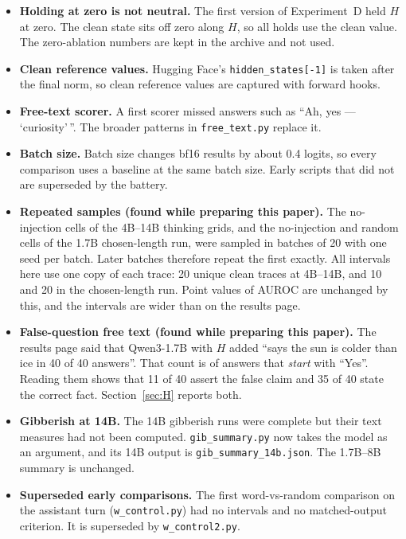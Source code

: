 \documentclass[11pt]{article}
\begin{document}
\begin{itemize}
  \item \textbf{Holding at zero is not neutral.} The first version of Experiment~D held $H$ at zero. The clean state sits off zero along $H$, so all holds use the clean value. The zero-ablation numbers are kept in the archive and not used.
  \item \textbf{Clean reference values.} Hugging Face's \texttt{hidden\_states[-1]} is taken after the final norm, so clean reference values are captured with forward hooks.
  \item \textbf{Free-text scorer.} A first scorer missed answers such as ``Ah, yes --- `curiosity'\,''. The broader patterns in \texttt{free\_text.py} replace it.
  \item \textbf{Batch size.} Batch size changes bf16 results by about 0.4 logits, so every comparison uses a baseline at the same batch size. Early scripts that did not are superseded by the battery.
  \item \textbf{Repeated samples (found while preparing this paper).} The no-injection cells of the 4B--14B thinking grids, and the no-injection and random cells of the 1.7B chosen-length run, were sampled in batches of 20 with one seed per batch. Later batches therefore repeat the first exactly. All intervals here use one copy of each trace: 20 unique clean traces at 4B--14B, and 10 and 20 in the chosen-length run. Point values of AUROC are unchanged by this, and the intervals are wider than on the results page.
  \item \textbf{False-question free text (found while preparing this paper).} The results page said that Qwen3-1.7B with $H$ added ``says the sun is colder than ice in 40 of 40 answers''. That count is of answers that \emph{start} with ``Yes''. Reading them shows that 11 of 40 assert the false claim and 35 of 40 state the correct fact. Section~\ref{sec:H} reports both.
  \item \textbf{Gibberish at 14B.} The 14B gibberish runs were complete but their text measures had not been computed. \texttt{gib\_summary.py} now takes the model as an argument, and its 14B output is \texttt{gib\_summary\_14b.json}. The 1.7B--8B summary is unchanged.
  \item \textbf{Superseded early comparisons.} The first word-vs-random comparison on the assistant turn (\texttt{w\_control.py}) had no intervals and no matched-output criterion. It is superseded by \texttt{w\_control2.py}.
\end{itemize}
\end{document}
